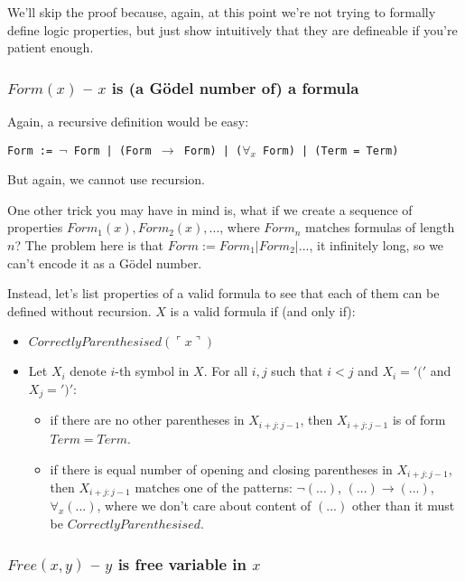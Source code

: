 \documentclass{article}
\begin{document}
We'll skip the proof because, again, at this point we're not trying to formally define
logic properties, but just show intuitively that they are defineable if you're patient enough.

\subsubsection{$Form(x)$ -- $x$ is (a Gödel number of) a formula}

Again, a recursive definition would be easy:

\begin{center}
    \texttt{Form := $\neg$ Form | (Form $\rightarrow$ Form) | ($\forall_x$ Form) | (Term = Term)}
\end{center}

But again, we cannot use recursion.

One other trick you may have in mind is, what if we create a sequence of properties
$Form_1(x), Form_2(x), ...$, where $Form_n$ matches formulas of length $n$? The problem here is that
$Form := Form_1 | Form_2 | ...$, it infinitely long, so we can't encode it as a Gödel number.

Instead, let's list properties of a valid formula to see that each of them can be defined without
recursion.
$X$ is a valid formula if (and only if):
\begin{itemize}
    \item $CorrectlyParenthesised(\ulcorner x \urcorner)$
    \item Let $X_i$ denote $i$-th symbol in $X$. For all $i, j$ such that $i < j$ and $X_i = '('$
        and $X_j = ')'$:
        \begin{itemize}
            \item if there are no other parentheses in $X_{i + j : j - 1}$, then $X_{i + j : j - 1}$
                is of form $Term = Term$.
            \item if there is equal number of opening and closing parentheses in $X_{i + j : j - 1}$,
                then $X_{i + j : j - 1}$ matches one of the patterns: $\neg (...)$, $(...) \rightarrow (...)$,
                $\forall_x (...)$, where we don't care about content of $(...)$ other than it must be
                $CorrectlyParenthesised$.
        \end{itemize}
\end{itemize}

\subsubsection{$Free(x, y)$ -- $y$ is free variable in $x$}
\end{document}
